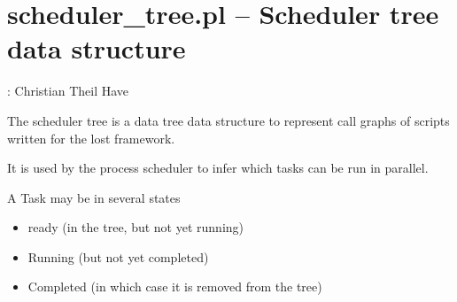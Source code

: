 


\section{scheduler_tree.pl -- Scheduler tree data structure}

\label{sec:schedulertree}

\begin{tags}
: Christian Theil Have

The scheduler tree is a data tree data structure to represent call graphs
of scripts written for the lost framework.

It is used by the process scheduler to infer which tasks can be run in parallel.

A Task may be in several states

\begin{itemize}
    \item ready (in the tree, but not yet running)
    \item Running (but not yet completed)
    \item Completed (in which case it is removed from the tree)
\end{itemize}
\end{tags}

\vspace{0.7cm}

